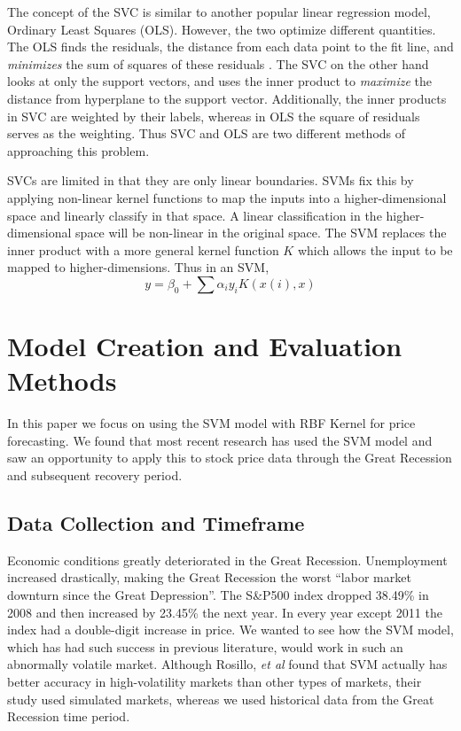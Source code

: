 \documentclass[pageno]{jpaper}
\begin{document}
The concept of the SVC is similar to another popular linear regression model, Ordinary Least Squares (OLS). However, the two optimize different quantities. The OLS finds the residuals, the distance from each data point to the fit line, and {\em minimizes} the sum of squares of these residuals \cite{watson}. The SVC on the other hand looks at only the support vectors, and uses the inner product to {\em maximize} the distance from hyperplane to the support vector. Additionally, the inner products in SVC are weighted by their labels, whereas in OLS the square of residuals serves as the weighting. Thus SVC and OLS are two different methods of approaching this problem.

SVCs are limited in that they are only linear boundaries. SVMs fix this by applying non-linear kernel functions to map the inputs into a higher-dimensional space and linearly classify in that space. A linear classification in the higher-dimensional space will be non-linear in the original space. The SVM replaces the inner product with a more general kernel function $K$ which allows the input to be mapped to higher-dimensions. Thus in an SVM,
$$y = \beta_0 + \sum \alpha_i y_i K(x(i),x)$$

\section{Model Creation and Evaluation Methods}
In this paper we focus on using the SVM model with RBF Kernel for price forecasting. We found that most recent research has used the SVM model and saw an opportunity to apply this to stock price data through the Great Recession and subsequent recovery period. 

\subsection{Data Collection and Timeframe}
\label{subsec: data}
Economic conditions greatly deteriorated in the Great Recession. Unemployment increased drastically, making the Great Recession the worst ``labor market downturn since the Great Depression''\cite{katz}. The S\&P500 index dropped 38.49\% in 2008 and then increased by 23.45\% the next year\cite{sp500returns}. In every year except 2011 the index had a double-digit increase in price. We wanted to see how the SVM model, which has had such success in previous literature, would work in such an abnormally volatile market. Although Rosillo, {\em et al} found that SVM actually has better accuracy in high-volatility markets than other types of markets, their study used simulated markets, whereas we used historical data from the Great Recession time period\cite{rosillo}.
\end{document}
